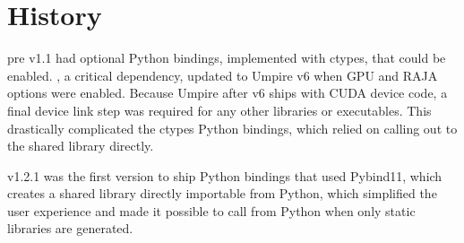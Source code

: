 \section{History}

\exago pre v1.1 had optional Python bindings, implemented with ctypes, that could be enabled. \hiop, a critical dependency, updated to Umpire v6 when GPU and RAJA options were enabled. Because Umpire after v6 ships with CUDA device code, a final device link step was required for any other libraries or executables. This drastically complicated the ctypes Python bindings, which relied on calling out to the shared library directly.

\exago v1.2.1 was the first version to ship Python bindings that used Pybind11, which creates a shared library directly importable from Python, which simplified the user experience and made it possible to call \exago from Python when only static libraries are generated.